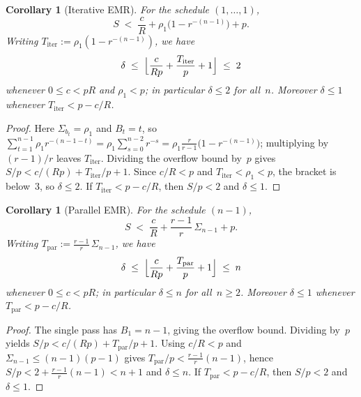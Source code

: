 \documentclass[reqno]{amsart}
\newtheorem{corollary}[theorem]{Corollary}
\theoremstyle{definition}
\begin{document}
\begin{corollary}[Iterative EMR]\label{cor:iter}
For the schedule $(1,\dots,1)$,
\[
  S \;<\; \frac{c}{R}+\rho_1\bigl(1-r^{-(n-1)}\bigr)+p.
\]
Writing $T_{\mathrm{iter}}:=\rho_1(1-r^{-(n-1)})$, we have
\[
  \delta \;\le\; \Bigl\lfloor \frac{c}{Rp}+\frac{T_{\mathrm{iter}}}{p}+1 \Bigr\rfloor
  \;\le\; 2
\]
whenever $0\le c<pR$ and $\rho_1<p$; in particular $\delta\le 2$ for all~$n$.
Moreover $\delta\le 1$ whenever $T_{\mathrm{iter}}<p-c/R$.
\end{corollary}

\begin{proof}
Here $\Sigma_{b_t}=\rho_1$ and $B_t=t$, so $\sum_{t=1}^{n-1}\rho_1 r^{-(n-1-t)}=\rho_1\sum_{s=0}^{n-2}r^{-s}=\rho_1\frac{r}{r-1}\bigl(1-r^{-(n-1)}\bigr)$; multiplying by $(r-1)/r$ leaves $T_{\mathrm{iter}}$.
Dividing the overflow bound by~$p$ gives $S/p<c/(Rp)+T_{\mathrm{iter}}/p+1$.
Since $c/R<p$ and $T_{\mathrm{iter}}<\rho_1<p$, the bracket is below~$3$, so $\delta\le 2$.
If $T_{\mathrm{iter}}<p-c/R$, then $S/p<2$ and $\delta\le 1$.
\end{proof}

\begin{corollary}[Parallel EMR]\label{cor:par}
For the schedule $(n-1)$,
\[
  S \;<\; \frac{c}{R}+\frac{r-1}{r}\,\Sigma_{n-1}+p.
\]
Writing $T_{\mathrm{par}}:=\frac{r-1}{r}\,\Sigma_{n-1}$, we have
\[
  \delta \;\le\; \Bigl\lfloor \frac{c}{Rp}+\frac{T_{\mathrm{par}}}{p}+1 \Bigr\rfloor
  \;\le\; n
\]
whenever $0\le c<pR$; in particular $\delta\le n$ for all~$n\ge 2$.
Moreover $\delta\le 1$ whenever $T_{\mathrm{par}}<p-c/R$.
\end{corollary}

\begin{proof}
The single pass has $B_1=n-1$, giving the overflow bound.
Dividing by~$p$ yields $S/p<c/(Rp)+T_{\mathrm{par}}/p+1$.
Using $c/R<p$ and $\Sigma_{n-1}\le(n-1)(p-1)$ gives $T_{\mathrm{par}}/p<\frac{r-1}{r}(n-1)$, hence $S/p<2+\frac{r-1}{r}(n-1)<n+1$ and $\delta\le n$.
If $T_{\mathrm{par}}<p-c/R$, then $S/p<2$ and $\delta\le 1$.
\end{proof}
\end{document}
